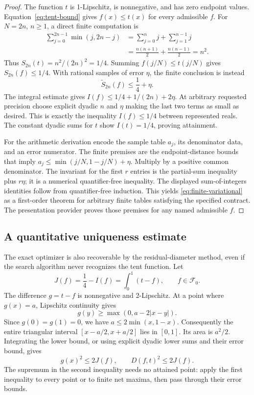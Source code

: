 \begin{proof}
The function \(t\) is 1-Lipschitz, is nonnegative, and has zero endpoint values. Equation~\eqref{eq:tent-bound} gives \(f(x)\leq t(x)\) for every admissible \(f\). For \(N=2n\), \(n\geq1\), a direct finite computation is
\begin{align*}
 \sum_{j=0}^{2n-1}\min(j,2n-j)
 &=\sum_{j=0}^{n}j+\sum_{j=1}^{n-1}j\\
 &=\frac{n(n+1)}2+\frac{n(n-1)}2=n^2.
\end{align*}
Thus \(S_{2n}(t)=n^2/(2n)^2=1/4\). Summing \(f(j/N)\leq t(j/N)\) gives \(S_{2n}(f)\leq1/4\). With rational samples of error \(\eta\), the finite conclusion is instead
\begin{equation}
   \widetilde S_{2n}(f)\leq\frac14+\eta.
 \label{eq:finite-variational}
\end{equation}
The integral estimate gives \(I(f)\leq1/4+1/(2n)+2\eta\). At arbitrary requested precision choose explicit dyadic \(n\) and \(\eta\) making the last two terms as small as desired. This is exactly the inequality \(I(f)\leq1/4\) between represented reals. The constant dyadic sums for \(t\) show \(I(t)=1/4\), proving attainment.

For the arithmetic derivation encode the sample table \(a_j\), its denominator data, and an error numerator. The finite premises are the endpoint-distance bounds that imply \(a_j\leq\min(j/N,1-j/N)+\eta\). Multiply by a positive common denominator. The invariant for the first \(r\) entries is the partial-sum inequality plus \(r\eta\); it is a numerical quantifier-free inequality. The displayed sum-of-integers identities follow from quantifier-free induction. This yields \eqref{eq:finite-variational} as a first-order theorem for arbitrary finite tables satisfying the specified contract. The presentation provider proves those premises for any named admissible \(f\).
\end{proof}

\subsection{A quantitative uniqueness estimate}

The exact optimizer is also recoverable by the residual-diameter method, even if the search algorithm never recognizes the tent function. Let
\[
 J(f)=\frac14-I(f)=\int_0^1(t-f),\qquad f\in\mathcal F_0.
\]
The difference \(g=t-f\) is nonnegative and 2-Lipschitz. At a point where \(g(x)=a\), Lipschitz continuity gives
\[
 g(y)\geq\max(0,a-2|x-y|).
\]
Since \(g(0)=g(1)=0\), we have \(a\leq2\min(x,1-x)\). Consequently the entire triangular interval \([x-a/2,x+a/2]\) lies in \([0,1]\). Its area is \(a^2/2\). Integrating the lower bound, or using explicit dyadic lower sums and their error bound, gives
\begin{equation}
   g(x)^2\leq2J(f),\qquad
   D(f,t)^2\leq2J(f).
 \label{eq:tent-residual}
\end{equation}
The supremum in the second inequality needs no attained point: apply the first inequality to every point or to finite net maxima, then pass through their error bounds.

